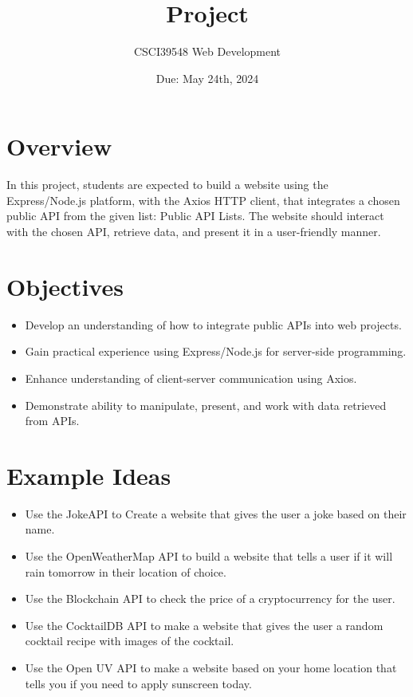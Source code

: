 \documentclass{article}
\title{Project}
\author{CSCI39548 Web Development}
\date{Due: May 24th, 2024}
\begin{document}
\maketitle


\section{Overview}
In this project, students are expected to build a website using the\\
Express/Node.js platform, with the Axios HTTP client, that integrates a chosen\\
public API from the given list: Public API Lists. The website should interact\\
with the chosen API, retrieve data, and present it in a user-friendly manner.


\section{Objectives}
\begin{itemize}
  \item Develop an understanding of how to integrate public APIs into web projects.
  \item Gain practical experience using Express/Node.js for server-side programming.
  \item Enhance understanding of client-server communication using Axios.
  \item Demonstrate ability to manipulate, present, and work with data retrieved from APIs.
\end{itemize}


\section{Example Ideas}
\begin{itemize}
  \item Use the JokeAPI to Create a website that gives the user a joke based on their name.
  \item  Use the OpenWeatherMap API to build a website that tells a user if it will rain tomorrow in their location of choice.
  \item Use the Blockchain API to check the price of a cryptocurrency for the user.
  \item Use the CocktailDB API to make a website that gives the user a random cocktail recipe with images of the cocktail.
  \item Use the Open UV API to make a website based on your home location that tells you if you need to apply sunscreen today.
\end{itemize}
\end{document}
